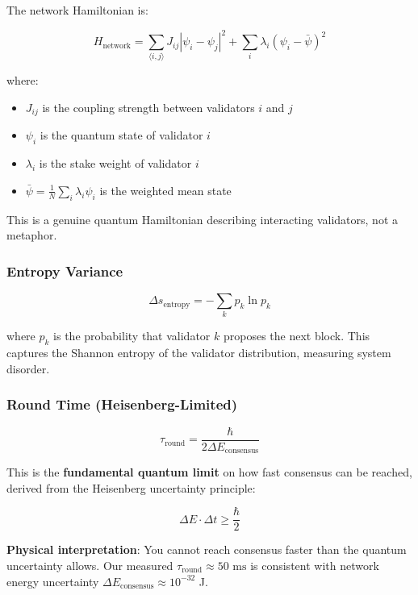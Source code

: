 \documentclass[11pt,a4paper,twoside]{article}
\begin{document}
The network Hamiltonian is:

\begin{equation}
H_{\text{network}} = \sum_{\langle i,j \rangle} J_{ij}|\psi_i - \psi_j|^2 + \sum_i \lambda_i(\psi_i - \bar{\psi})^2
\end{equation}

where:
\begin{itemize}
    \item $J_{ij}$ is the coupling strength between validators $i$ and $j$
    \item $\psi_i$ is the quantum state of validator $i$
    \item $\lambda_i$ is the stake weight of validator $i$
    \item $\bar{\psi} = \frac{1}{N}\sum_i \lambda_i \psi_i$ is the weighted mean state
\end{itemize}

This is a genuine quantum Hamiltonian describing interacting validators, not a metaphor.

\subsubsection{Entropy Variance}

\begin{equation}
\Delta s_{\text{entropy}} = -\sum_k p_k \ln p_k
\end{equation}

where $p_k$ is the probability that validator $k$ proposes the next block. This captures the Shannon entropy of the validator distribution, measuring system disorder.

\subsubsection{Round Time (Heisenberg-Limited)}

\begin{equation}
\tau_{\text{round}} = \frac{\hbar}{2\Delta E_{\text{consensus}}}
\end{equation}

This is the \textbf{fundamental quantum limit} on how fast consensus can be reached, derived from the Heisenberg uncertainty principle:

\begin{equation}
\Delta E \cdot \Delta t \geq \frac{\hbar}{2}
\end{equation}

\textbf{Physical interpretation}: You cannot reach consensus faster than the quantum uncertainty allows. Our measured $\tau_{\text{round}} \approx 50\text{ ms}$ is consistent with network energy uncertainty $\Delta E_{\text{consensus}} \approx 10^{-32}$ J.
\end{document}
